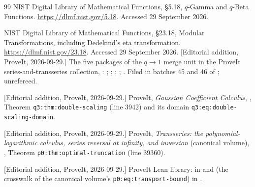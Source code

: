 \documentclass[11pt,a4paper]{article}
\theoremstyle{definition}
\theoremstyle{remark}
\begin{document}
\begin{thebibliography}{99}
NIST Digital Library of Mathematical Functions, \S5.18,
$q$-Gamma and $q$-Beta Functions.
\url{https://dlmf.nist.gov/5.18}. Accessed 29 September 2026.

NIST Digital Library of Mathematical Functions, \S23.18,
Modular Transformations, including Dedekind's eta transformation.
\url{https://dlmf.nist.gov/23.18}. Accessed 29 September 2026.
[Editorial addition, ProveIt, 2026-09-29.] The five packages of the
$q\to1$ merge unit in the ProveIt series-and-transseries collection,
:
;
;
;
;
.
Filed in batches 45 and 46 of ; unrefereed.

[Editorial addition, ProveIt, 2026-09-29.] ProveIt, \emph{Gaussian
Coefficient Calculus},
,
Theorem \texttt{q3:thm:double-scaling} (line 3942) and its domain
\texttt{q3:eq:double-scaling-domain}.

[Editorial addition, ProveIt, 2026-09-29.] ProveIt, \emph{Transseries: the
polynomial-logarithmic calculus, series reversal at infinity, and
inversion} (canonical volume),
,
Theorem \texttt{p0:thm:optimal-truncation} (line 39360).

[Editorial addition, ProveIt, 2026-09-29.] ProveIt Lean library:
 in
and  (the crosswalk of the canonical volume's
\texttt{p0:eq:transport-bound}) in
.
\end{thebibliography}
\end{document}
